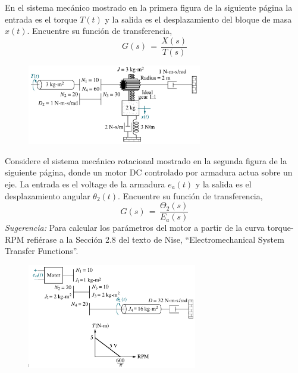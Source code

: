 \documentclass[ a4paper, twoside, 11pt]{article}
\begin{document}
\begin{problem}
En el sistema mec\'anico mostrado en la primera figura de la siguiente p\'agina la entrada es el torque $T(t)$ y la salida es el desplazamiento del bloque de masa $x(t)$. \linebreak Encuentre su funci\'on de transferencia, \iec
\[
G(s) \, = \, 
\frac{X(s)}{T(s)}
\]
\begin{figure}[htb]
\centering
\includegraphics[width=0.68\textwidth]{figures/Nise_Prob-2-40.jpg}
\end{figure}

\end{problem}
\vspace{\baselineskip}

\begin{problem}
Considere el sistema mec\'anico rotacional mostrado en la segunda figura de la siguiente p\'agina, donde un motor DC controlado por armadura actua sobre un eje. \linebreak La entrada es el voltage de la armadura $e_a(t)$ y la salida es el desplazamiento angular $\theta_2(t)$. Encuentre su funci\'on de transferencia, \iec
\[
G(s) \, = \, 
\frac{\Theta_2(s)}{E_a(s)}
\]
\emph{Sugerencia:} Para calcular los par\'ametros del motor a partir de la curva torque-RPM refi\'erase a la Secci\'on 2.8 del texto de Nise, ``Electromechanical System Transfer Functions''.

\begin{figure}[ht]
\centering
\includegraphics[width=0.66\textwidth]{figures/Nise_Prob-2-43.jpg}
\end{figure}



\end{problem}
\vspace{\baselineskip}
\end{document}
